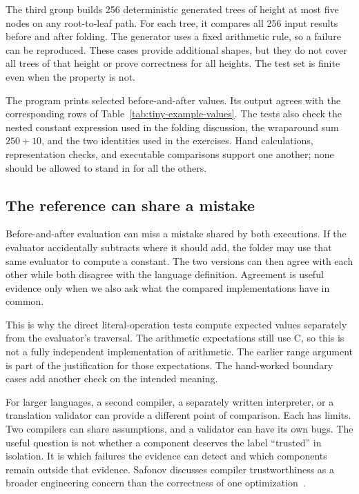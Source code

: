 The third group builds 256 deterministic generated trees of height at most five nodes on any root-to-leaf path.
For each tree, it compares all 256 input results before and after folding.
The generator uses a fixed arithmetic rule, so a failure can be reproduced.
These cases provide additional shapes, but they do not cover all trees of that height or prove correctness for all heights.
The test set is finite even when the property is not.

The program  prints selected before-and-after values.
Its output agrees with the corresponding rows of Table~\ref{tab:tiny-example-values}.
The tests also check the nested constant expression used in the folding discussion, the wraparound sum $250+10$, and the two identities used in the exercises.
Hand calculations, representation checks, and executable comparisons support one another; none should be allowed to stand in for all the others.

\subsection{The reference can share a mistake}
\label{sec:tiny-oracle-risk}

Before-and-after evaluation can miss a mistake shared by both executions.
If the evaluator accidentally subtracts where it should add, the folder may use that same evaluator to compute a constant.
The two versions can then agree with each other while both disagree with the language definition.
Agreement is useful evidence only when we also ask what the compared implementations have in common.

This is why the direct literal-operation tests compute expected values separately from the evaluator's traversal.
The arithmetic expectations still use C, so this is not a fully independent implementation of arithmetic.
The earlier range argument is part of the justification for those expectations.
The hand-worked boundary cases add another check on the intended meaning.

For larger languages, a second compiler, a separately written interpreter, or a translation validator can provide a different point of comparison.
Each has limits.
Two compilers can share assumptions, and a validator can have its own bugs.
The useful question is not whether a component deserves the label \enquote{trusted} in isolation.
It is which failures the evidence can detect and which components remain outside that evidence.
Safonov discusses compiler trustworthiness as a broader engineering concern than the correctness of one optimization~\cite{safonov-2010-trustworthy}.


